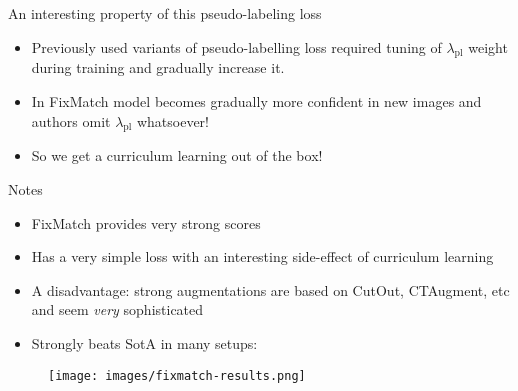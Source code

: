 \documentclass[10pt]{beamer}
\begin{document}
\begin{frame}{An interesting property of this pseudo-labeling loss}
    \begin{itemize}
        \item\pause Previously used variants of pseudo-labelling loss required tuning of $\lambda_\text{pl}$ weight during training and gradually increase it.
        \item\pause In FixMatch model becomes gradually more confident in new images and authors omit $\lambda_\text{pl}$ whatsoever!
        \item\pause So we get a curriculum learning out of the box!
    \end{itemize}
\end{frame}

\begin{frame}{Notes}
\begin{itemize}
    \item\pause FixMatch provides very strong scores
    \item\pause Has a very simple loss with an interesting side-effect of curriculum learning
    \item\pause A disadvantage: strong augmentations are based on CutOut, CTAugment, etc and seem \textit{very} sophisticated
    \item\pause Strongly beats SotA in many setups:
\end{itemize}

\begin{figure}
    \centering
    \texttt{[image: images/fixmatch-results.png]}
\end{figure}
\end{frame}
\end{document}
